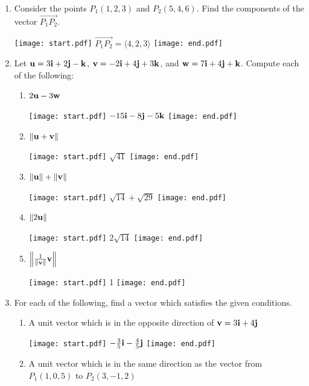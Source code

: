 \documentclass[12pt]{article}
\begin{document}
\begin{enumerate}
\item Consider the points $P_1(1,2,3)$ and $P_2(5,4,6)$.  Find the components of the vector $\overrightarrow{P_1P_2}$.

\texttt{[image: start.pdf]}
{{$\overrightarrow{P_1P_2}=\langle 4,2,3 \rangle$}}
\texttt{[image: end.pdf]}


\item Let ${\bf u}= 3{\bf i}+2{\bf j}-{\bf k}$, ${\bf v}=-2{\bf i}+4{\bf j}+3{\bf k}$, and ${\bf w}=7{\bf i}+4{\bf j}+{\bf k}$.  Compute each of the following:

\begin{enumerate}

\item $2{\bf u}-3{\bf w}$

\texttt{[image: start.pdf]}
{{$-15{\bf i}-8{\bf j}-5{\bf k}$}}
\texttt{[image: end.pdf]}


\item $\| {\bf u}+{\bf v}\|$

\texttt{[image: start.pdf]}
{{$\sqrt{41}$}}
\texttt{[image: end.pdf]}


\item $\| {\bf u}\|+\|{\bf v}\|$

\texttt{[image: start.pdf]}
{{$\sqrt{14}+\sqrt{29}$}}
\texttt{[image: end.pdf]}


\item $\|2{\bf u}\|$

\texttt{[image: start.pdf]}
{{$2\sqrt{14}$}}
\texttt{[image: end.pdf]}


\item $\left\|\frac{1}{\|{\bf v}\|}{\bf v}\right\|$

\texttt{[image: start.pdf]}
{{1}}
\texttt{[image: end.pdf]}


\end{enumerate}

\item For each of the following, find a vector which satisfies the given conditions.

\begin{enumerate}

\item A unit vector which is in the opposite direction of ${\bf v}=3{\bf i}+4{\bf j}$

\texttt{[image: start.pdf]}
{{$-\frac{3}{5}{\bf i}-\frac{4}{5}{\bf j}$}}
\texttt{[image: end.pdf]}


\item A unit vector which is in the same direction as the vector from $P_1(1,0,5)$ to $P_2(3,-1,2)$


\end{enumerate}
\end{enumerate}
\end{document}
